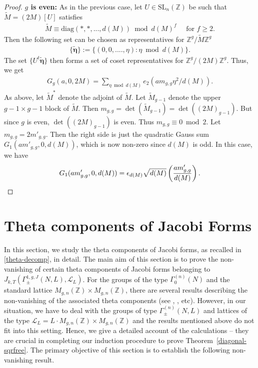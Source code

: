 \documentclass[11pt]{amsart}
\numberwithin{equation}{section}
\newcommand{\mbb}{\mathbb}
\newcommand{\mc}{\mathcal}
\newcommand{\mrm}{\mathrm} %
\newcommand{\slnz}{\mrm{SL}_n(\mbb Z)}
\newcommand{\q}{\quad}
\newcommand{\sumn}{\sum \nolimits}
\begin{document}
\begin{proof}
\textbf{$g$ is even:} As in the previous case, let $U\in\slnz$ be such that $\widetilde{M}=(2M)[U]$ satisfies
\begin{align*}
    \widetilde{M}\equiv\mrm{diag}(*, *,..., d(M)) \bmod d(M)^f \q \text{ for } f\ge 2.
\end{align*}
Then the following set can be chosen as representatives for $\mbb Z^g/ \widetilde{M} \mbb Z^g$
\begin{align}\label{coset-g-even}
    \{ \bm{ \tilde \eta}\}:= \{ (0,0,....,\eta): \eta\bmod d(M)\}.
\end{align}
The set $\{U^t\bm{\tilde \eta}\}$ then forms a set of coset representatives for $\mbb Z^g/(2M)\mbb Z^g$. Thus, we get
\begin{align}
G_g(a, 0, 2M)= \sumn_{\eta\bmod d(M)}e_2(am_{g,g}\eta^2/d(M)).    
\end{align}
As above, let $\widetilde{M}^*$ denote the adjoint of $\widetilde{M}$. Let $\widetilde{M}_{g-1}$ denote the upper $g-1\times g-1$ block of $\widetilde{M}$. Then $m_{g,g}=\det(\widetilde{M}_{g-1})=\det((2M)_{g-1})$. But since $g$ is even, $\det((2M)_{g-1})$ is even. Thus $m_{g,g}\equiv 0\bmod 2$. Let $m_{g,g}=2m'_{g,g}$. Then the right side is just the quadratic Gauss sum $G_1(am'_{g,g}, 0, d(M)) $, which is now non-zero since $d(M)$ is odd. In this case, we have
\begin{equation}
G_1(am'_{g,g}, 0, d(M))= \epsilon_{d(M)}\sqrt{d(M)}   \left(\frac{am'_{g,g}}{d(M)}\right).\qedhere
\end{equation}
\end{proof}

\section{Theta components of Jacobi Forms}


In this section, we study the theta components of Jacobi forms, as recalled in \eqref{theta-decomp}, in detail. The main aim of this section is to prove the non-vanishing of certain theta components of Jacobi forms belonging to $J_{k,T}(\Gamma_\pm^{1,g,J}(N,L), \mc L_L)$. For the groups of the type $\Gamma_0^{(n)}(N)$ and the standard lattice $M_{g,n}(\mbb Z)\times M_{g,n}(\mbb Z)$, there are several results describing the non-vanishing of the associated theta components (see \cite{anamby2024non}, \cite{boche-das}, \cite{shankhadhar2023sign} etc). However, in our situation, we have to deal with the groups of type $\Gamma_\pm^{(n)}(N, L)$ and lattices of the type $\mc L_L=L\cdot M_{g,n}(\mbb Z)\times M_{g,n}(\mbb Z)$ and the results mentioned above do not fit into this setting. Hence, we give a detailed account of the calculations -- they are crucial in completing our induction procedure to prove Theorem~\ref{diagonal-sqrfree}. The primary objective of this section is to establish the following non-vanishing result.
\end{document}
